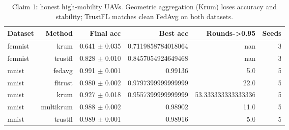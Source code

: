 \begin{table}[t]
\centering
\caption{Claim 1: honest high-mobility UAVs. Geometric aggregation (Krum) loses accuracy and stability; TrustFL matches clean FedAvg on both datasets.}
\label{tab:claim1}
\begin{tabular}{lrrrrr}
\toprule
Dataset & Method & Final acc & Best acc & Rounds->0.95 & Seeds \\
\midrule
femnist & krum & 0.641 $\pm$ 0.035 & 0.7119858784018064 & nan & 3 \\
femnist & trustfl & 0.828 $\pm$ 0.010 & 0.8457054924649468 & nan & 3 \\
mnist & fedavg & 0.991 $\pm$ 0.001 & 0.99136 & 5.0 & 5 \\
mnist & fltrust & 0.980 $\pm$ 0.002 & 0.9797399999999999 & 22.0 & 5 \\
mnist & krum & 0.927 $\pm$ 0.018 & 0.9557399999999999 & 53.333333333333336 & 5 \\
mnist & multikrum & 0.988 $\pm$ 0.002 & 0.98902 & 11.0 & 5 \\
mnist & trustfl & 0.989 $\pm$ 0.001 & 0.98916 & 5.0 & 5 \\
\bottomrule
\end{tabular}
\end{table}
